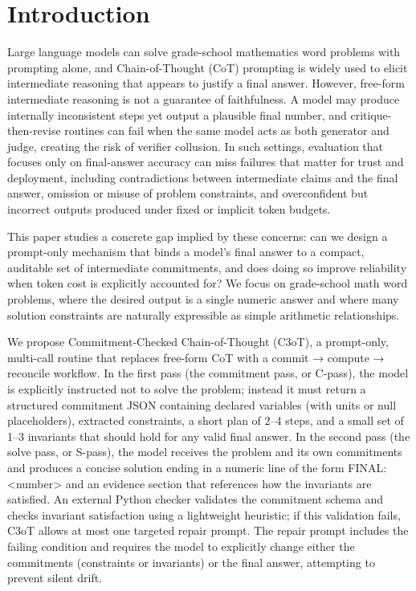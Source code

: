 \documentclass[journal,article,submit,pdftex,moreauthors]{Definitions/mdpi}
\begin{document}
\section{Introduction}

Large language models can solve grade-school mathematics word problems with prompting alone, and Chain-of-Thought (CoT) prompting is widely used to elicit intermediate reasoning that appears to justify a final answer. However, free-form intermediate reasoning is not a guarantee of faithfulness. A model may produce internally inconsistent steps yet output a plausible final number, and critique-then-revise routines can fail when the same model acts as both generator and judge, creating the risk of verifier collusion. In such settings, evaluation that focuses only on final-answer accuracy can miss failures that matter for trust and deployment, including contradictions between intermediate claims and the final answer, omission or misuse of problem constraints, and overconfident but incorrect outputs produced under fixed or implicit token budgets.

This paper studies a concrete gap implied by these concerns: can we design a prompt-only mechanism that binds a model’s final answer to a compact, auditable set of intermediate commitments, and does doing so improve reliability when token cost is explicitly accounted for? We focus on grade-school math word problems, where the desired output is a single numeric answer and where many solution constraints are naturally expressible as simple arithmetic relationships.

We propose Commitment-Checked Chain-of-Thought (C3oT), a prompt-only, multi-call routine that replaces free-form CoT with a commit → compute → reconcile workflow. In the first pass (the commitment pass, or C-pass), the model is explicitly instructed not to solve the problem; instead it must return a structured commitment JSON containing declared variables (with units or null placeholders), extracted constraints, a short plan of 2–4 steps, and a small set of 1–3 invariants that should hold for any valid final answer. In the second pass (the solve pass, or S-pass), the model receives the problem and its own commitments and produces a concise solution ending in a numeric line of the form FINAL: <number> and an evidence section that references how the invariants are satisfied. An external Python checker validates the commitment schema and checks invariant satisfaction using a lightweight heuristic; if this validation fails, C3oT allows at most one targeted repair prompt. The repair prompt includes the failing condition and requires the model to explicitly change either the commitments (constraints or invariants) or the final answer, attempting to prevent silent drift.
\end{document}
